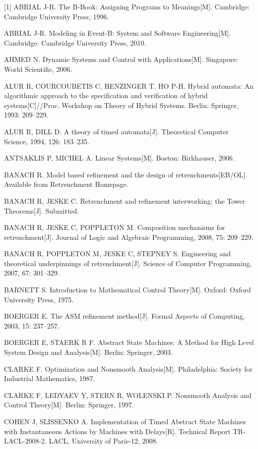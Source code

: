 {{\setlength{\parindent}{0em}
\setlength{\hangindent}{2em}
[1] ABRIAL J-R. The B-Book: Assigning Programs to Meanings[M]. Cambridge: Cambridge University Press, 1996.\par
[2] ABRIAL J-R. Modeling in Event-B: System and Software Engineering[M]. Cambridge: Cambridge University Press, 2010.\par
[3] AHMED N. Dynamic Systems and Control with Applications[M]. Singapore: World Scientific, 2006.\par
[4] ALUR R, COURCOUBETIS C, HENZINGER T, HO P-H. Hybrid automata: An algorithmic approach to the specification and verification of hybrid systems[C]//Proc. Workshop on Theory of Hybrid Systems. Berlin: Springer, 1993: 209--229.\par
[5] ALUR R, DILL D. A theory of timed automata[J]. Theoretical Computer Science, 1994, 126: 183--235.\par
[6] ANTSAKLIS P, MICHEL A. Linear Systems[M]. Boston: Birkhauser, 2006.\par
[7] BANACH R. Model based refinement and the design of retrenchments[EB/OL]. Available from Retrenchment Homepage.\par
[8] BANACH R, JESKE C. Retrenchment and refinement interworking: the Tower Theorems[J]. Submitted.\par
[9] BANACH R, JESKE C, POPPLETON M. Composition mechanisms for retrenchment[J]. Journal of Logic and Algebraic Programming, 2008, 75: 209--229.\par
[10] BANACH R, POPPLETON M, JESKE C, STEPNEY S. Engineering and theoretical underpinnings of retrenchment[J]. Science of Computer Programming, 2007, 67: 301--329.\par
[11] BARNETT S. Introduction to Mathematical Control Theory[M]. Oxford: Oxford University Press, 1975.\par
[12] BOERGER E. The ASM refinement method[J]. Formal Aspects of Computing, 2003, 15: 237--257.\par
[13] BOERGER E, STAERK R F. Abstract State Machines: A Method for High Level System Design and Analysis[M]. Berlin: Springer, 2003.\par
[14] CLARKE F. Optimization and Nonsmooth Analysis[M]. Philadelphia: Society for Industrial Mathematics, 1987.\par
[15] CLARKE F, LEDYAEV Y, STERN R, WOLENSKI P. Nonsmooth Analysis and Control Theory[M]. Berlin: Springer, 1997.\par
[16] COHEN J, SLISSENKO A. Implementation of Timed Abstract State Machines with Instantaneous Actions by Machines with Delays[R]. Technical Report TR-LACL-2008-2. LACL, University of Paris-12, 2008.\par
}}
